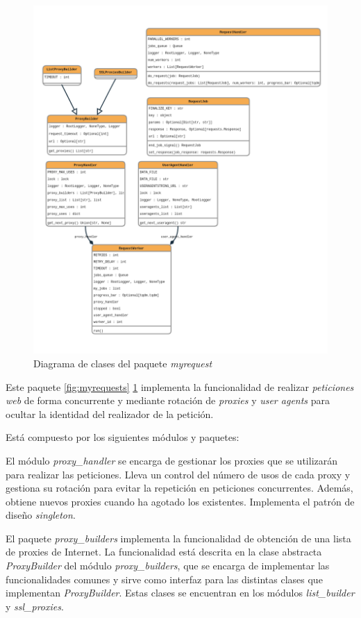 \begin{figure}[ht!]
    \centering
    \includegraphics[width=1\textwidth]{img/anexos/myrequests_classes.png}
    \caption{Diagrama de clases del paquete \textit{myrequest}}
    \label{fig:myrequest_classes}
\end{figure}

Este paquete \ref{fig:myrequests} \ref{fig:myrequest_classes} implementa la funcionalidad de realizar \textit{peticiones web} de forma concurrente
y mediante rotación de \textit{proxies} y \textit{user agents} para ocultar la identidad del realizador
de la petición.

Está compuesto por los siguientes módulos y paquetes:

El módulo \textit{proxy\_handler} se encarga de gestionar los proxies que se utilizarán para
realizar las peticiones. Lleva un control del número de usos de cada proxy y gestiona su rotación
para evitar la repetición en peticiones concurrentes. Además, obtiene nuevos proxies cuando ha
agotado los existentes. Implementa el patrón de diseño \textit{singleton}.

El paquete \textit{proxy\_builders} implementa la funcionalidad de obtención de una lista de
proxies de Internet. La funcionalidad está descrita en la clase abstracta \textit{ProxyBuilder} del módulo \textit{proxy\_builders},
que se encarga de implementar las funcionalidades comunes y sirve como interfaz para las distintas
clases que implementan \textit{ProxyBuilder}. Estas clases se encuentran en los
módulos \textit{list\_builder} y \textit{ssl\_proxies}.

